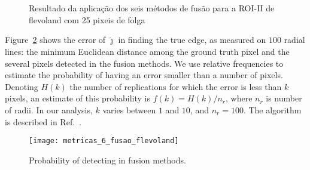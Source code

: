 \begin{figure}[hbt]
	\centering
     \\
     \\
     \caption{Resultado da aplicação dos seis métodos de fusão para a ROI-II de flevoland com 25 pixeis de folga}
     \label{fusion_sf_met}
\end{figure}
\clearpage
Figure~\ref{probability_edge_detc} shows the error of $\widehat\jmath$ in finding the true edge, as measured on $100$ radial lines: the minimum Euclidean distance among the ground truth pixel and the several pixels detected in the fusion methods.
We use relative frequencies to estimate the probability of having an error smaller than a number of pixels. 
Denoting $H(k)$ the number of replications for which the error is less than $k$ pixels, an estimate of this probability is $f(k)={H(k)}/{n_r}$, where $n_r$ is number of radii. 
In our analysis, $k$ varies between $1$ and $10$, and $n_r=100$. 
The algorithm is described in Ref.~\cite{fbgm}.

\begin{figure}[hbt]
\centering
	\texttt{[image: metricas\_6\_fusao\_flevoland]}
	\caption{Probability of detecting in fusion methods.}
\label{probability_edge_detc}
\end{figure}


